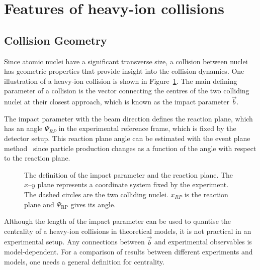 \pagebreak
\FloatBarrier
\section{Features of heavy-ion collisions}
\label{sec:features}
\subsection{Collision Geometry}
\label{sec:geometry}
Since atomic nuclei have a significant transverse size, a collision between nuclei has geometric properties that provide insight into the collision dynamics.  One illustration of a heavy-ion collision is shown in Figure~\ref{fig:planes}. The main defining parameter of a collision is the vector connecting the centres of the two colliding nuclei at their closest approach, which is known as the impact parameter $\vec b$.

The impact parameter with the beam direction defines the reaction plane, which has an angle $\Psi_{RP}$ in the experimental reference frame, which is fixed by the detector setup. This reaction plane angle can be estimated with the event plane method~\cite{Voloshin:2008dg} since particle production changes as a function of the angle with respect to the reaction plane. 
\begin{figure}[h!]
\centering
%      

\caption[The definitions of the Reaction Plane coordinate systems]{The definition of the impact parameter and the reaction plane. The $x$--$y$ plane represents a coordinate system fixed by the experiment. The dashed circles are the two colliding nuclei. $x_{RP}$ is the reaction plane and $\Psi_\mathrm{RP}$ gives its angle.} %
\label{fig:planes}
\end{figure}

Although the length of the impact parameter can be used to quantise the centrality of a heavy-ion collisions in theoretical models, it is not practical in an experimental setup. Any connections between $\vec b$ and experimental observables is model-dependent. For a comparison of results between different experiments and models, one needs a general definition for centrality.

